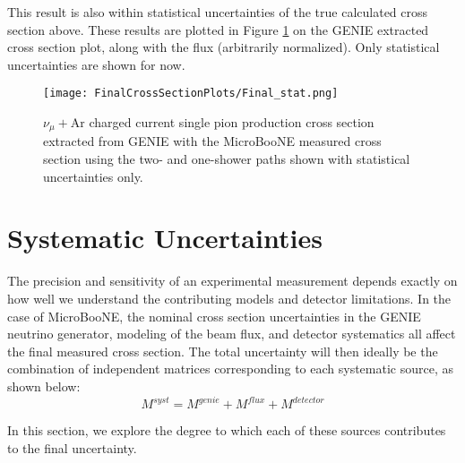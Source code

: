 \noindent This result is also within statistical uncertainties of the true calculated cross section above. These results are plotted in Figure \ref{fig:genie_uboone_xsec} on the GENIE extracted cross section plot, along with the flux (arbitrarily normalized).  Only statistical uncertainties are shown for now.

\begin{figure}[h!]
\centering
\texttt{[image: FinalCrossSectionPlots/Final\_stat.png]}
\caption{ $\nu_{\mu}+\text{Ar}$ charged current single pion production cross section extracted from GENIE with the MicroBooNE measured cross section using the two- and one-shower paths shown with statistical uncertainties only. }
\label{fig:genie_uboone_xsec}
\end{figure}

\clearpage
\section{Systematic Uncertainties}
The precision and sensitivity of an experimental measurement depends exactly on how well we understand the contributing models and detector limitations. In the case of MicroBooNE, the nominal cross section uncertainties in the GENIE neutrino generator, modeling of the beam flux, and detector systematics all affect the final measured cross section. The total uncertainty will then ideally be the combination of independent matrices corresponding to each systematic source, as shown below:
\begin{equation}
\label{eq:sys_error}
M^{syst} =  M^{genie} + M^{flux} + M^{detector}
\end{equation}

\noindent In this section, we explore the degree to which each of these sources contributes to the final uncertainty. 
